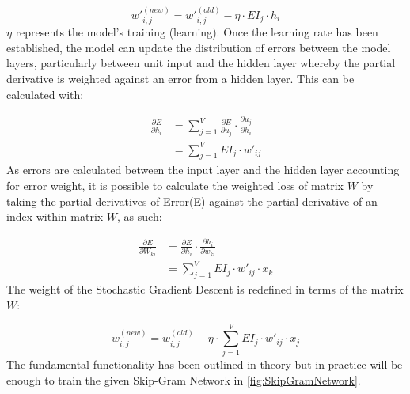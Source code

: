 \begin{equation}
    w'^{(new)}_{i,j} = w'^{(old)}_{i,j} - \eta \cdot EI_{j} \cdot h_{i}
\end{equation}
$\eta$ represents the model's training (learning). Once the learning rate has been established, the model can update the distribution of errors between the model layers, particularly between unit input and the hidden layer whereby the partial derivative is weighted against an error from a hidden layer. This can be calculated with:

\begin{equation}
    \begin{split}
        \frac{\partial E}{\partial h_{i}} & = \sum_{j=1}^{V} \frac{\partial E}{\partial u_{j}} \cdot \frac{\partial u_{j}}{\partial h_{i}} \\
                                          & = \sum_{j=1}^{V} EI_{j} \cdot w'_{ij}
    \end{split}
\end{equation}
As errors are calculated between the input layer and the hidden layer accounting for error weight, it is possible to calculate the weighted loss of matrix $W$ by taking the partial derivatives of Error(E) against the partial derivative of an index within matrix $W$, as such:

\begin{equation} \label{}
    \begin{split}
        \frac{\partial E}{\partial W_{ki}} & = \frac{\partial E}{\partial h_{i}} \cdot \frac{\partial h_{i}}{\partial w_{ki}} \\
                                           & = \sum_{j=1}^{V} EI_{j} \cdot w'_{ij} \cdot x_{k}
    \end{split}
\end{equation}
The weight of the Stochastic Gradient Descent is redefined in terms of the matrix $W$:


\begin{equation}
    w^{(new)}_{i,j} = w^{(old)}_{i,j} - \eta \cdot \sum_{j=1}^{V} EI_{j} \cdot w'_{ij} \cdot x_{j}
\end{equation}
The fundamental functionality has been outlined in theory but in practice will be enough to train the given Skip-Gram Network in \autoref{fig:SkipGramNetwork}.


